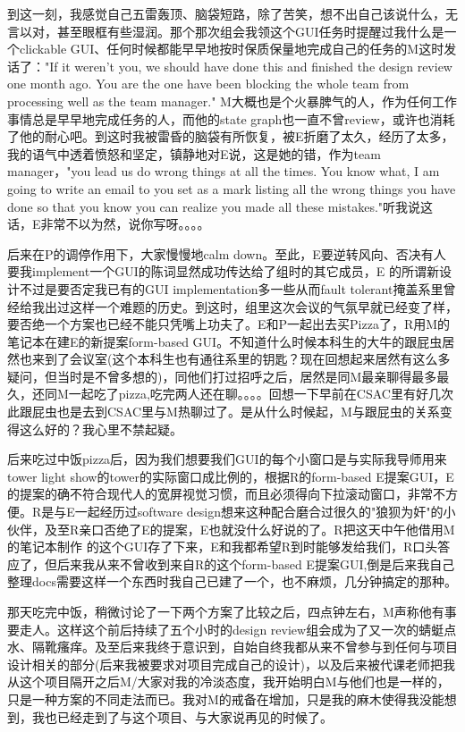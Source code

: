 \documentclass[12pt]{book}
\begin{document}
到这一刻，我感觉自己五雷轰顶、脑袋短路，除了苦笑，想不出自己该说什么，无言以对，甚至眼框有些湿润。那个那次组会我领这个GUI任务时提醒过我什么是一个clickable GUI、任何时候都能早早地按时保质保量地完成自己的任务的M这时发话了："If it weren't you, we should have done this and finished the design review one month ago. You are the one have been blocking the whole team from processing well as the team manager." M大概也是个火暴脾气的人，作为任何工作事情总是早早地完成任务的人，而他的state graph也一直不曾review，或许也消耗了他的耐心吧。到这时我被雷昏的脑袋有所恢复，被E折磨了太久，经历了太多，我的语气中透着愤怒和坚定，镇静地对E说，这是她的错，作为team manager，"you lead us do wrong things at all the times. You know what, I am going to write an email to you set as a mark listing all the wrong things you have done so that you know you can realize you made all these mistakes."听我说这话，E非常不以为然，说你写呀。。。。

后来在P的调停作用下，大家慢慢地calm down。至此，E要逆转风向、否决有人要我implement一个GUI的陈词显然成功传达给了组时的其它成员，E 的所谓新设计不过是要否定我已有的GUI implementation多一些从而fault tolerant掩盖系里曾经给我出过这样一个难题的历史。到这时，组里这次会议的气氛早就已经变了样，要否绝一个方案也已经不能只凭嘴上功夫了。E和P一起出去买Pizza了，R用M的笔记本在建E的新提案form-based GUI。不知道什么时候本科生的大牛的跟屁虫居然也来到了会议室(这个本科生也有通往系里的钥匙？现在回想起来居然有这么多疑问，但当时是不曾多想的)，同他们打过招呼之后，居然是同M最亲聊得最多最久，还同M一起吃了pizza,吃完两人还在聊。。。。回想一下早前在CSAC里有好几次此跟屁虫也是去到CSAC里与M热聊过了。是从什么时候起，M与跟屁虫的关系变得这么好的？我心里不禁起疑。

后来吃过中饭pizza后，因为我们想要我们GUI的每个小窗口是与实际我导师用来tower light show的tower的实际窗口成比例的，根据R的form-based E提案GUI，E的提案的确不符合现代人的宽屏视觉习惯，而且必须得向下拉滚动窗口，非常不方便。R是与E一起经历过software design想来这种配合磨合过很久的"狼狈为奸"的小伙伴，及至R亲口否绝了E的提案，E也就没什么好说的了。R把这天中午他借用M的笔记本制作 的这个GUI存了下来，E和我都希望R到时能够发给我们，R口头答应了，但后来我从来不曾收到来自R的这个form-based E提案GUI,倒是后来我自己整理docs需要这样一个东西时我自己已建了一个，也不麻烦，几分钟搞定的那种。

那天吃完中饭，稍微讨论了一下两个方案了比较之后，四点钟左右，M声称他有事要走人。这样这个前后持续了五个小时的design review组会成为了又一次的蜻蜓点水、隔靴瘙痒。及至后来我终于意识到，自始自终我都从来不曾参与到任何与项目设计相关的部分(后来我被要求对项目完成自己的设计)，以及后来被代课老师把我从这个项目隔开之后M/大家对我的冷淡态度，我开始明白M与他们也是一样的，只是一种方案的不同走法而已。我对M的戒备在增加，只是我的麻木使得我没能想到，我也已经走到了与这个项目、与大家说再见的时候了。
\end{document}

